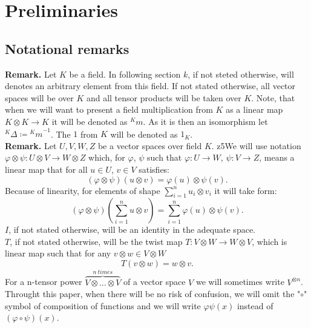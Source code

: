 \documentclass[a4paper, 12pt]{report}
\begin{document}
\section{Preliminaries}

\subsection{Notational remarks}
\indent \textbf{Remark. }Let $K$ be a field. In following section $k$, if not steted otherwise, will
denotes an arbitrary element from this field. If not stated otherwise, all vector spaces will be over $K$
and all tensor products will be taken over $K$. Note, that when we will want to present a field
multiplication from $K$ as a linear map $K \otimes K \to K$ it will be denoted as ${^Km}$. As it is then an
isomorphism let ${^K\Delta} \coloneqq {^Km}^{-1}$. The $1$ from $K$ will be denoted as $1_K$.\\[8pt]
\textbf{Remark. } Let $U, V, W, Z$ be a vector spaces over field $K$.
z5We will use notation
$\varphi \otimes \psi:U \otimes V \to W \otimes Z$ which, for
$\varphi$, $\psi$ such that $\varphi : U \to W$, $\psi : V \to Z$, means a linear map that
for all $u \in U$, $v \in V$ satisfies:
\begin{equation*}
(\varphi \otimes \psi)(u \otimes v) = \varphi(u) \otimes \psi(v).
\end{equation*}
Because of linearity, for elements of shape $\displaystyle\sum^n_{i=1} u_i \otimes v_i$ it will take form:
\begin{equation*}
(\varphi \otimes \psi)(\sum^n_{i = 1} u \otimes v) = \sum^n_{i = 1}\varphi(u) \otimes \psi(v).
\end{equation*}
$I$, if not stated otherwise, will be an identity in the adequate space. \\
$T$, if not stated otherwise, will
be the twist map $T:V \otimes W \to W\otimes V$, which is linear map such that for any $v \otimes w
\in V \otimes W$
\begin{equation*}
T(v \otimes w) = w\otimes v.
\end{equation*}
For a n-tensor power $\overbrace{V \otimes \dots \otimes V}^{n\ times}$  of a vector space $V$ we will
sometimes write $V^{\otimes n}$.\\
Throught this paper, when there will be no risk
of confusion, we will omit the "$\circ$" symbol of composition of functions and we will write
$\varphi \psi (x)$ instead of $(\varphi \circ \psi)(x)$.
\end{document}
